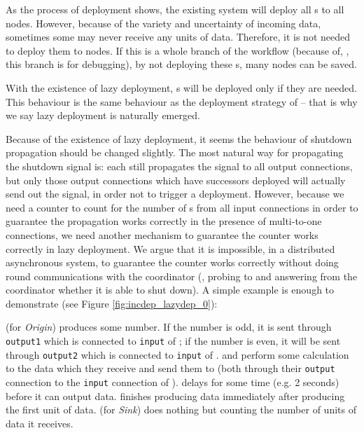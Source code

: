 As the process of deployment shows, the existing \dpy system will deploy all \tPEInst{}s to all nodes. However, because of the variety and uncertainty of incoming data, sometimes some \tPEInst may never receive any units of data. Therefore, it is not needed to deploy them to nodes. If this is a whole branch of the workflow (because of, \eg, this branch is for debugging), by not deploying these \tPEInst{}s, many nodes can be saved.

With the existence of lazy deployment, \tPEInst{}s will be deployed only if they are needed. This behaviour is the same behaviour as the deployment strategy of \tincdep -- that is why we say lazy deployment is naturally emerged.

Because of the existence of lazy deployment, it seems the behaviour of shutdown propagation should be changed slightly. The most natural way for propagating the shutdown signal is: each \tPEInst still propagates the \dEOS signal to all output connections, but only those output connections which have successors deployed will actually send out the \dEOS signal, in order not to trigger a deployment. However, because we need a counter to count for the number of \dEOS{}s from all input connections in order to guarantee the propagation works correctly in the presence of multi-to-one connections, we need another mechanism to guarantee the counter works correctly in lazy deployment. We argue that it is impossible, in a distributed asynchronous system, to guarantee the counter works correctly without doing round communications with the coordinator (\eg, probing to and answering from the coordinator whether it is able to shut down). A simple example is enough to demonstrate (see Figure \ref{fig:incdep_lazydep_0}):


\ndO (for \emph{Origin}) produces some number. If the number is odd, it is sent through \lstinline|output1| which is connected to \lstinline|input| of \ndA; if the number is even, it will be sent through \lstinline|output2| which is connected to \lstinline|input| of \ndB. \ndA and \ndB perform some calculation to the data which they receive and send them to \ndS (both through their \lstinline|output| connection to the \lstinline|input| connection of \ndS). \ndB delays for some time (e.g. 2 seconds) before it can output data. \ndA finishes producing data immediately after producing the first unit of data. \ndS (for \emph{Sink}) does nothing but counting the number of units of data it receives.

